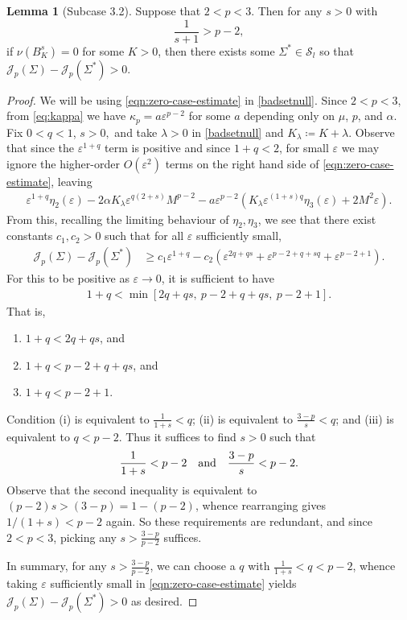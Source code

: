 \documentclass[preprint, reqno]{amsart}
\renewcommand{\epsilon}{\varepsilon}
\theoremstyle{definition}
\newtheorem{lemma}[definition]{Lemma}
\numberwithin{equation}{section}
\begin{document}
\begin{lemma}[Subcase 3.2]\label{sbig-new}
  Suppose that $2 < p < 3$. Then for any $s>0$ with
  \[
    \frac{1}{s+1}> p-2,
  \]
  if $\nu(B_K^s) = 0$ for some $K>0$, then there exists some
  $\Sigma^* \in \mathcal{S}_l$ so that $\mathscr{J}_p(\Sigma) -
  \mathscr{J}_p(\Sigma^*) > 0$.
\end{lemma}
\begin{proof}
  We will be using \eqref{eqn:zero-case-estimate} in
  \cref{badsetnull}. Since $2 < p < 3$, from \eqref{eq:kappa} we have
  $\kappa_p = a \epsilon^{p-2}$ for some $a$ depending only on $\mu$,
  $p$, and $\alpha$. Fix $0 < q < 1$, $s>0,$ and take $\lambda > 0$ in
  \cref{badsetnull} and $K_{\lambda} \coloneqq K + \lambda$. Observe
  that since the $\epsilon^{1+q}$ term is positive and since $1 + q <
  2$, for small $\epsilon$ we may ignore the higher-order
  $O(\epsilon^2)$ terms on the right hand side of
  \eqref{eqn:zero-case-estimate}, leaving
  \begin{align*}
    \epsilon^{1+q}\eta_2(\epsilon)
    -{2\alpha}K_\lambda \epsilon^{q(2+s)} M^{p-2} - a
    \epsilon^{p-2} (K_{\lambda}\epsilon^{(1 + s)q}\eta_3(\epsilon) + 2
    M^2 \epsilon).
  \end{align*}
  From this, recalling the limiting behaviour of $\eta_2, \eta_3$, we
  see that there exist constants $c_1, c_2 > 0$ such that for all
  $\epsilon$ sufficiently small,
  \begin{align*}
    \mathscr J_p(\Sigma) - \mathscr J_p(\Sigma^*)
    & \ge c_1 \epsilon^{1+q} - c_2(\epsilon^{2q+qs} +
      \epsilon^{p-2+ q+sq} + \epsilon^{p-2+1}).
  \end{align*}
  For this to be positive as $\epsilon \to 0$, it is sufficient to
  have
  \begin{align*}
    1+q < \min[ 2q+qs, \ p-2+q+qs, \ p-2+1].
  \end{align*}
  That is,
  \begin{enumerate}[label=(\roman*)]
    \item $1+q< 2q+qs$, and
    \item $1+q < p-2+q+qs$, and
    \item $1+q < p-2+1$.
  \end{enumerate}
  Condition (i) is equivalent to $\frac{1}{1+s} < q$; (ii) is
  equivalent to $\frac{3-p}{s} < q$; and (iii) is equivalent to $q<
  p-2$. Thus it suffices to find $s > 0$ such that
  \begin{align*}
    \frac{1}{1+s} < p-2 \quad \hbox{and} \quad \frac{3-p}{s} < p-2.
  \end{align*}
  Observe that the second inequality is equivalent to $(p-2)s > (3-p)
  = 1 - (p-2)$, whence rearranging gives $1/(1+s) < p-2$ again. So
  these requirements are redundant, and since $2 < p < 3$, picking any
  $s > \frac{3-p}{p-2}$ suffices.

  In summary{, for any $s > \frac{3-p}{p-2}$, we can choose a $q$
    with $\frac{1}{1+s} < q < p-2$, whence taking $\epsilon$
    sufficiently small in \eqref{eqn:zero-case-estimate} yields
    $\mathscr J_p(\Sigma) - \mathscr J_p(\Sigma^*) > 0$ as desired.}
\end{proof}
\end{document}
